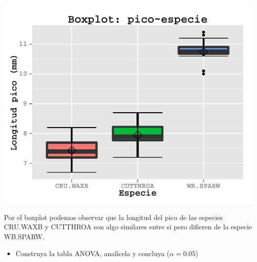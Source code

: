 \documentclass[a4paper]{scrartcl}\usepackage[]{graphicx}\usepackage[]{color}
\makeatletter
\def\maxwidth{ %
  \ifdim\Gin@nat@width>\linewidth
    \linewidth
  \else
    \Gin@nat@width
  \fi
}
\newenvironment{knitrout}{}{} %
\makeatother
\begin{document}
\begin{itemize}
\begin{itemize}
\begin{itemize}
\begin{itemize}
\begin{knitrout}
{\centering \includegraphics[width=\maxwidth]{figure/unnamed-chunk-24} 

}



\end{knitrout}

\noindent Por el boxplot podemos observar que la longitud del pico de las especies CRU.WAXB y CUTTHROA son algo similares entre si pero difieren de la especie WB.SPARW.

\begin{itemize}
  \item Construya la tabla ANOVA, analícela y concluya ($\alpha = 0.05$)
\end{itemize}


\end{itemize}
\end{itemize}
\end{itemize}
\end{itemize}
\end{document}
